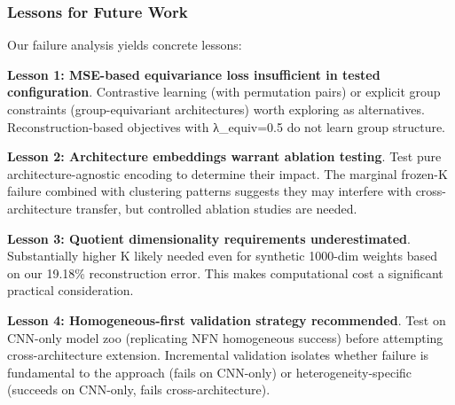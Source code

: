 \subsubsection{Lessons for Future Work}

Our failure analysis yields concrete lessons:

\textbf{Lesson 1: MSE-based equivariance loss insufficient in tested configuration}. Contrastive learning (with permutation pairs) or explicit group constraints (group-equivariant architectures) worth exploring as alternatives. Reconstruction-based objectives with λ_equiv=0.5 do not learn group structure.

\textbf{Lesson 2: Architecture embeddings warrant ablation testing}. Test pure architecture-agnostic encoding to determine their impact. The marginal frozen-K failure combined with clustering patterns suggests they may interfere with cross-architecture transfer, but controlled ablation studies are needed.

\textbf{Lesson 3: Quotient dimensionality requirements underestimated}. Substantially higher K likely needed even for synthetic 1000-dim weights based on our 19.18\% reconstruction error. This makes computational cost a significant practical consideration.

\textbf{Lesson 4: Homogeneous-first validation strategy recommended}. Test on CNN-only model zoo (replicating NFN homogeneous success) before attempting cross-architecture extension. Incremental validation isolates whether failure is fundamental to the approach (fails on CNN-only) or heterogeneity-specific (succeeds on CNN-only, fails cross-architecture).
